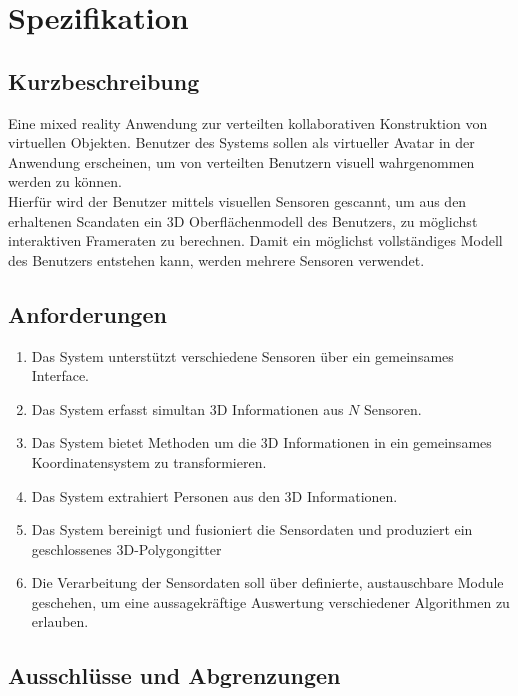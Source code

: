 \section{Spezifikation}

\subsection{Kurzbeschreibung}
Eine mixed reality Anwendung zur verteilten kollaborativen Konstruktion von virtuellen Objekten. Benutzer des Systems sollen als virtueller Avatar in der Anwendung erscheinen, um von verteilten Benutzern visuell wahrgenommen werden zu können.\\
Hierfür wird der Benutzer mittels visuellen Sensoren gescannt, um aus den erhaltenen Scandaten ein 3D Oberflächenmodell des Benutzers, zu möglichst interaktiven Frameraten zu berechnen. Damit ein möglichst vollständiges Modell des Benutzers entstehen kann, werden mehrere Sensoren verwendet.

\subsection{Anforderungen}

\begin{enumerate}
	\item Das System unterstützt verschiedene Sensoren über ein gemeinsames Interface.
	\item Das System erfasst simultan 3D Informationen aus $N$ Sensoren.
	\item Das System bietet Methoden um die 3D Informationen in ein gemeinsames Koordinatensystem zu transformieren.
	\item Das System extrahiert Personen aus den 3D Informationen.
	\item Das System bereinigt und fusioniert die Sensordaten und produziert ein geschlossenes 3D-Polygongitter
	\item Die Verarbeitung der Sensordaten soll über definierte, austauschbare Module geschehen, um eine aussagekräftige Auswertung verschiedener Algorithmen zu erlauben.
\end{enumerate}

\subsection{Ausschlüsse und Abgrenzungen}

